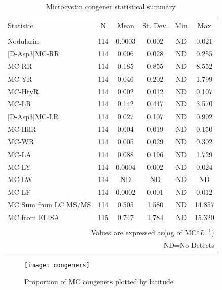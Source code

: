 \begin{table}[!ht]
\centering
  \caption{Microcystin congener statistical summary}
  \label{}
\begin{tabular}{@{\extracolsep{5pt}}lccccc}
\\[-1.8ex]\hline
\hline \\[-1.8ex]
Statistic & \multicolumn{1}{c}{N} & \multicolumn{1}{c}{Mean} & \multicolumn{1}{c}{St. Dev.} & \multicolumn{1}{c}{Min} & \multicolumn{1}{c}{Max} \\
\hline \\[-1.8ex]
Nodularin & 114 & 0.0003 & 0.002 & ND & 0.021 \\
{[D-Asp3]}MC-RR & 114 & 0.006 & 0.028 & ND & 0.255 \\
MC-RR & 114 & 0.185 & 0.855 & ND & 8.552 \\
MC-YR & 114 & 0.046 & 0.202 & ND & 1.799 \\
MC-HtyR & 114 & 0.002 & 0.012 & ND & 0.107 \\
MC-LR & 114 & 0.142 & 0.447 & ND & 3.570 \\
{[D-Asp3]}MC-LR & 114 & 0.027 & 0.107 & ND & 0.902 \\
MC-HilR & 114 & 0.004 & 0.019 & ND & 0.150 \\
MC-WR & 114 & 0.005 & 0.029 & ND & 0.302 \\
MC-LA & 114 & 0.088 & 0.196 & ND & 1.729 \\
MC-LY & 114 & 0.0004 & 0.002 & ND & 0.024 \\
MC-LW & 114 & ND & ND & ND & ND \\
MC-LF & 114 & 0.0002 & 0.001 & ND & 0.012 \\
MC Sum from LC MS/MS  & 114 & 0.505 & 1.580 & ND & 14.857 \\
MC from ELISA & 115 & 0.747 & 1.784 & ND & 15.320 \\
\hline \\[-1.8ex]
\multicolumn{6}{r}{Values are expressed as($\mu$g of MC*${L^{-1}}$)} \\
\multicolumn{6}{r}{ND=No Detects} \\
\end{tabular}
\end{table}

\begin{figure}[!ht]
  \texttt{[image: congeners]}
    \caption{Proportion of MC congeners plotted by latitude}
  \label{congenerlat}
\end{figure}

